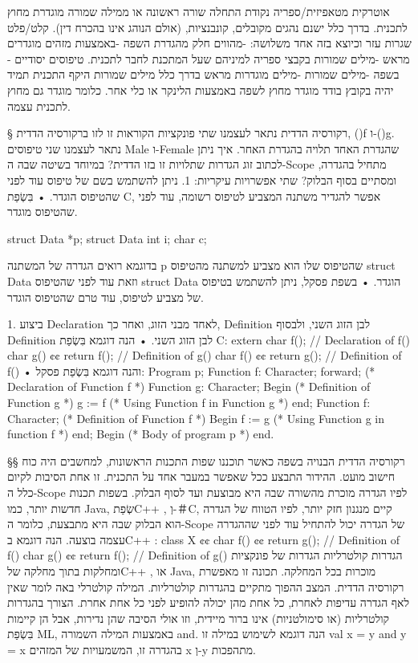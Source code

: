 אוטרקית
מטאפיזית/ספריה
נקודת התחלה
שורה ראשונה או ממילה שמורה
מוגדרת מחוץ לתכנית.
בדרך כלל ישנם נהגים מקובלים, קונבנציות, (אולם הנוהג אינו בהכרח דין).
קלט/פלט
שגרות עזר וכיוצא בזה
אחד משלושה:
-מהווים חלק מהגדרת השפה
-באמצעות מזהים מוגדרים מראש
-מילים שמורות
בקבצי ספריה למיניהם שעל המתכנת לחבר לתכנית.
טיפוסים יסודיים
-בשפה
-מילים שמורות
-מילים מוגדרות מראש
בדרך כלל מילים שמורות
היקף התכנית
תמיד יהיה בקובץ בודד
מוגדר מחוץ לשפה באמצעות הלינקר או כלי אחר. כלומר מוגדר גם מחוץ לתכנית עצמה.

§  רקורסיה הדדית
נתאר לעצמנו שתי פונקציות הקוראות זו לזו ברקורסיה הדדית, ()f ו-()g. נתאר לעצמנו שני טיפוסים Male ו-Female שהגדרת האחד תלויה בהגדרת האחר.
איך ניתן לכתוב זוג הגדרות שתלויות זו בזו הדדית? במיוחד בשיטה שבה ה-Scope מתחיל בהגדרה, ומסתיים בסוף הבלוק?
שתי אפשרויות עיקריות:
1. ניתן להשתמש בשם של טיפוס עוד לפני שהטיפוס הוגדר.
    • בִּשְׂפַת C, אפשר להגדיר משתנה המצביע לטיפוס רשומה, עוד לפני שהטיפוס מוגדר.

struct Data *p;
struct Data {int i; char c; }

בדוגמא רואים הגדרה של המשתנה p שהטיפוס שלו הוא מצביע למשתנה מהטיפוס struct Data וזאת עוד לפני שהטיפוס struct Data הוגדר.
    • בשפת פסקל, ניתן להשתמש בטיפוס של מצביע לטיפוס, עוד טרם שהטיפוס הוגדר.

1. ביצוע Declaration לאחד מבני הזוג, ואחר כך, Definition לבן הזוג השני, ולבסוף Definition לבן הזוג השני.
    • הנה דוגמא בִּשְׂפַת C:
extern char f(); // Declaration of f()
char g() {¢¢ return f(); } // Definition of g()
char f() {¢¢ return g(); } // Definition of f()
• והנה דוגמא בִּשְׂפַת פסקל:
Program p;
Function f: Character;
forward; (* Declaration of Function f *)
Function g: Character;
Begin (* Definition of Function g *)
g := f (* Using Function f in Function g *)
end;
Function f: Character; (* Definition of Function f *)
Begin
f := g (* Using Function g in function f *)
end;
Begin
(* Body of program p *)
end.

§§  רקורסיה הדדית הבנויה בשפה
כאשר תוכננו שפות התכנות הראשונות, למחשבים היה כוח חישוב מועט. ההידור התבצע ככל
שאפשר במעבר אחד על התכנית. זו אחת הסיבות לקיום כלל ה-Scope לפיו הגדרה מוכרת
מהשורה שבה היא מבוצעת ועד לסוף הבלוק. בשפות תכנות חדשות יותר, כמו Java, שְׂפַתC++
, וְ-＃C, קיים מנגנון חזק יותר, לפיו הטווח של הגדרה הוא הבלוק שבה היא מתבצעת,
כלומר ה-Scope של הגדרה יכול להתחיל עוד לפני שההגדרה עצמה בוצעה. הנה דוגמא בC++
:
class X {¢¢
char f() {¢¢ return g(); } // Definition of f()
char g() {¢¢ return f(); } // Definition of g()
}
הגדרות קולטרליות
הגדרות של פונקציות ומחלקות בתוך מחלקה שלC++ , או Java, מוכרות בכל המחלקה. תכונה
זו מאפשרת רקורסיה הדדית. המצב ההפוך מתקיים בהגדרות קולטרליות. המילה קולטרלי באה
לומר שאין לאף הגדרה עדיפות לאחרת, כל אחת מהן יכולה להופיע לפני כל אחת אחרת.
הצורך בהגדרות קולטרליות (או סימולטניות) אינו ברור מיידית, וזו אולי הסיבה שהן
נדירות, אבל הן קיימות בִּשְׂפַת ML, באמצעות המילה השמורה and. הנה דוגמא לשימוש
במילה זו
val x = y and y = x
בהגדרה זו, המשמעויות של המזהים x וְ-y מתהפכות.
    
